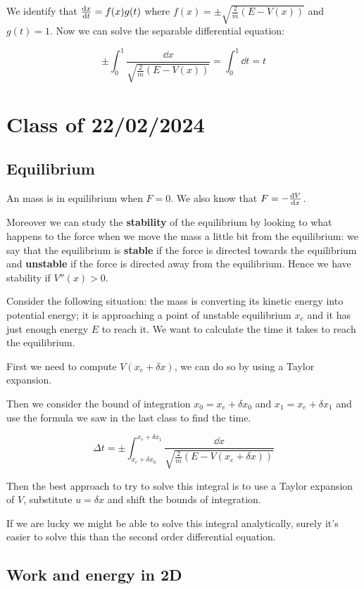 \documentclass[10pt]{extarticle}
\begin{document}
We identify that $\dv{x}{t} = f(x)g(t)$ where $f(x) = \pm \sqrt{\frac{2}{m} (E - V(x))}$ and $g(t) = 1$.
Now we can solve the separable differential equation:

$$
    \pm \int_0^1 \frac{\dd{x}}{\sqrt{\frac{2}{m} (E - V(x))}} = \int_0^1 \dd{t} = t
$$

\section{Class of 22/02/2024}

\subsection{Equilibrium}

An mass is in equilibrium when $F = 0$.
We also know that $F = -\dv{V}{x}$.

Moreover we can study the \textbf{stability} of the equilibrium by looking to what happens to the force when we move the mass a little bit from the equilibrium:
we say that the equilibrium is \textbf{stable} if the force is directed towards the equilibrium and \textbf{unstable} if the force is directed away from the equilibrium. Hence we have stability if $V''(x) > 0$.

Consider the following situation:
the mass is converting its kinetic energy into potential energy; it is approaching a point of unstable equilibrium $x_e$ and it has just enough energy $E$ to reach it.
We want to calculate the time it takes to reach the equilibrium.

First we need to compute $V(x_e + \delta x)$, we can do so by using a Taylor expansion.

Then we consider the bound of integration $x_0 = x_e + \delta x_0$ and $x_1 = x_e + \delta x_1$ and use the formula we saw in the last class to find the time.

$$
    \Delta t = \pm \int_{x_e + \delta x_0}^{x_e + \delta x_1} \frac{\dd{x}}{\sqrt{\frac{2}{m} (E - V(x_e + \delta x))}}
$$

Then the best approach to try to solve this integral is to use a Taylor expansion of $V$, substitute $u = \delta x$ and shift the bounds of integration.

If we are lucky we might be able to solve this integral analytically, surely it's easier to solve this than the second order differential equation.

\subsection{Work and energy in 2D}
\end{document}
